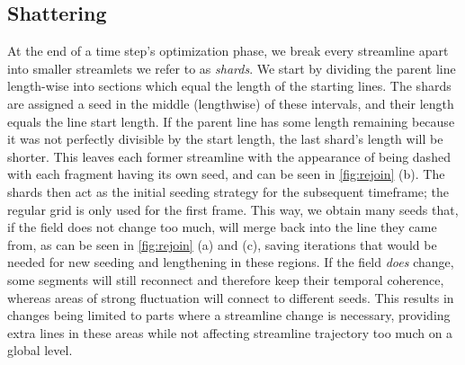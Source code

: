 \subsection{Shattering}
At the end of a time step's optimization phase, we break every streamline apart into smaller streamlets we refer to as \textit{shards}.
We start by dividing the parent line length-wise into sections which equal the length of the starting lines.
The shards are assigned a seed in the middle (lengthwise) of these intervals, and their length equals the line start length.
If the parent line has some length remaining because it was not perfectly divisible by the start length, the last shard's length will be shorter.
This leaves each former streamline with the appearance of being dashed with each fragment having its own seed, and can be seen in \cref{fig:rejoin} (b).
The shards then act as the initial seeding strategy for the subsequent timeframe; the regular grid is only used for the first frame.
This way, we obtain many seeds that, if the field does not change too much, will merge back into the line they came from, as can be seen in \cref{fig:rejoin} (a) and (c),
saving iterations that would be needed for new seeding and lengthening in these regions.
If the field \textit{does} change, some segments will still reconnect and therefore keep their temporal coherence,
whereas areas of strong fluctuation will connect to different seeds.
This results in changes being limited to parts where a streamline change is necessary,
providing extra lines in these areas while not affecting streamline trajectory too much on a global level.
\newpage

